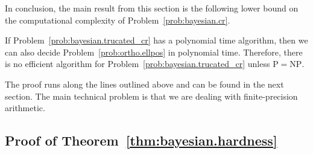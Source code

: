 In conclusion, the main result from this section is the following lower bound on the computational complexity of Problem~\ref{prob:bayesian.cr}.
\begin{theorem}\label{thm:bayesian.hardness}
  If Problem~\ref{prob:bayesian.trucated_cr} has a polynomial time algorithm, then we can also decide Problem~\ref{prob:ortho.ellpos} in polynomial time.
  Therefore, there is no efficient algorithm for Problem~\ref{prob:bayesian.trucated_cr} unless $\mathrm{P} = \mathrm{NP}$.
\end{theorem}

The proof runs along the lines outlined above and can be found in the next section.
The main technical problem is that we are dealing with finite-precision arithmetic.


\subsection{Proof of Theorem~\ref{thm:bayesian.hardness}}%
\label{sub:error.proof_bayesina}

